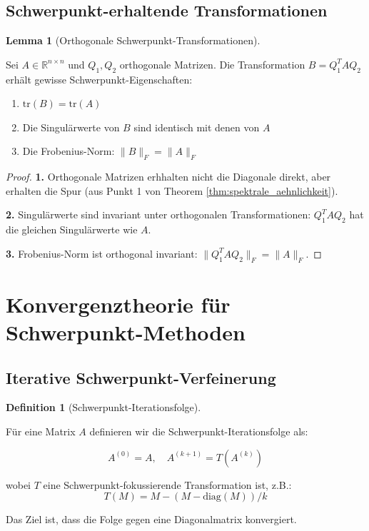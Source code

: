 \documentclass[a4paper,12pt]{article}
\theoremstyle{definition}
\newtheorem{definition}{Definition}
\newtheorem{lemma}{Lemma}
\begin{document}
\subsection{Schwerpunkt-erhaltende Transformationen}

\begin{lemma}[Orthogonale Schwerpunkt-Transformationen]
\label{lem:orthogonal_schwerpunkt}

Sei $A \in \mathbb{R}^{n \times n}$ und $Q_1, Q_2$ orthogonale Matrizen. Die Transformation $B = Q_1^T A Q_2$ erhält gewisse Schwerpunkt-Eigenschaften:

\begin{enumerate}
\item $\text{tr}(B) = \text{tr}(A)$
\item Die Singulärwerte von $B$ sind identisch mit denen von $A$
\item Die Frobenius-Norm: $\|B\|_F = \|A\|_F$
\end{enumerate}

\begin{proof}
\textbf{1.} Orthogonale Matrizen erhhalten nicht die Diagonale direkt, aber erhalten die Spur (aus Punkt 1 von Theorem \ref{thm:spektrale_aehnlichkeit}).

\textbf{2.} Singulärwerte sind invariant unter orthogonalen Transformationen: $Q_1^T A Q_2$ hat die gleichen Singulärwerte wie $A$.

\textbf{3.} Frobenius-Norm ist orthogonal invariant: $\|Q_1^T A Q_2\|_F = \|A\|_F$.
\end{proof}
\end{lemma}

\section{Konvergenztheorie für Schwerpunkt-Methoden}

\subsection{Iterative Schwerpunkt-Verfeinerung}

\begin{definition}[Schwerpunkt-Iterationsfolge]
\label{def:schwerpunkt_iterationsfolge}

Für eine Matrix $A$ definieren wir die Schwerpunkt-Iterationsfolge als:

\[
A^{(0)} = A, \quad A^{(k+1)} = T(A^{(k)})
\]

wobei $T$ eine Schwerpunkt-fokussierende Transformation ist, z.B.:
\[
T(M) = M - (M - \text{diag}(M)) / k
\]

Das Ziel ist, dass die Folge gegen eine Diagonalmatrix konvergiert.
\end{definition}
\end{document}
